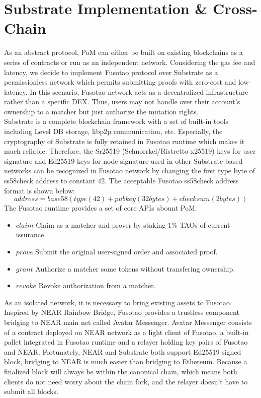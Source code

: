 \documentclass[a4paper,12pt]{article}
\begin{document}
\section{Substrate Implementation \& Cross-Chain}
\label{sec:orge2652f5}
As an abstract protocol, PoM can either be built on existing blockchains as a series of contracts or run as an independent network. Considering the gas fee and latency, we decide to implement Fusotao protocol over Substrate as a permissionless network which permits submitting proofs with zero-cost and low-latency. In this scenario, Fusotao network acts as a decentralized infrastructure rather than a specific DEX. Thus, users may not handle over their account’s ownership to a matcher but just authorize the mutation rights.\\
Substrate is a complete blockchain framework with a set of built-in tools including Level DB storage, libp2p communication, etc. Especially, the cryptography of Substrate is fully retained in Fusotao runtime which makes it much reliable. Therefore, the Sr25519 (Schnorrkel/Ristretto x25519) keys for user signature and Ed25519 keys for node signature used in other Substrate-based networks can be recognized in Fusotao network by changing the first type byte of ss58check address to constant \(42\). The acceptable Fusotao ss58check address format is shown below:\\
\begin{equation*}
address = base58(type(42)+pubkey(32 bytes)+checksum(2 bytes))
\end{equation*}
The Fusotao runtime provides a set of core APIs abount PoM:\\
\begin{itemize}
    \item $claim$ Claim as a matcher and prover by staking 1\% TAOs of current issurance.
    \item $prove$ Submit the original user-signed order and associated proof.
    \item $grant$ Authorize a matcher some tokens without transfering ownership.
    \item $revoke$ Revoke authorization from a matcher.
\end{itemize}
As an isolated network, it is necessary to bring existing assets to Fusotao. Inspired by NEAR Rainbow Bridge, Fusotao provides a trustless component bridging to NEAR main net called Avatar Messenger. Avatar Messenger consists of a contract deployed on NEAR network as a light client of Fusotao, a built-in pallet integrated in Fusotao runtime and a relayer holding key pairs of Fusotao and NEAR. Fortunately, NEAR and Substrate both support Ed25519 signed block, bridging to NEAR is much easier than bridging to Ethereum. Because a finalized block will always be within the canonical chain, which means both clients do not need worry about the chain fork, and the relayer doesn’t have to submit all blocks.\\
\end{document}
